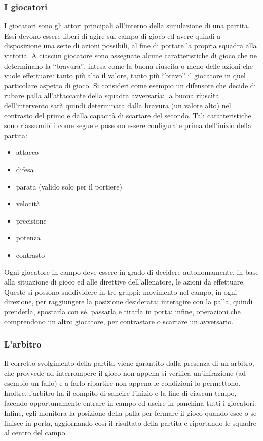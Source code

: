 \subsubsection{I giocatori}
\label{sec:analisi_giocatori}

I giocatori sono gli attori principali all'interno della simulazione di una partita. Essi devono essere liberi di agire sul campo di gioco ed avere quindi a disposizione una serie di azioni possibili, al fine di portare la propria squadra alla vittoria. A ciascun giocatore sono assegnate alcune caratteristiche di gioco che ne determinano la ``bravura'', intesa come la buona riuscita o meno delle azioni che vuole effettuare: tanto più alto il valore, tanto più ``bravo'' il giocatore in quel particolare aspetto di gioco. Si consideri come esempio un difensore che decide di rubare palla all'attaccante della squadra avversaria: la buona riuscita dell'intervento sarà quindi determinata dalla bravura (un valore alto) nel contrasto del primo e dalla capacità di scartare del secondo. Tali caratteristiche sono riassumibili come segue e possono essere configurate prima dell'inizio della partita:

\begin{itemize}
	\item attacco
	\item difesa
	\item parata (valido solo per il portiere)
	\item velocità
	\item precisione
	\item potenza
	\item contrasto
\end{itemize}

Ogni giocatore in campo deve essere in grado di decidere autonomamente, in base alla situazione di gioco ed alle direttive dell'allenatore, le azioni da effettuare. Queste  si possono suddividere in tre gruppi: movimento nel campo, in ogni direzione, per raggiungere la posizione desiderata; interagire con la palla, quindi prenderla, spostarla con sé, passarla e tirarla in porta; infine, operazioni che comprendono un altro giocatore, per contrastare o scartare un avversario.\\

\subsubsection{L'arbitro}
\label{sec:analisi_arbitro}

Il corretto svolgimento della partita viene garantito dalla presenza di un arbitro, che provvede ad interrompere il gioco non appena si verifica un'infrazione (ad esempio un fallo) e a farlo ripartire non appena le condizioni lo permettono. Inoltre, l'arbitro ha il compito di sancire l'inizio e la fine di ciascun tempo, facendo opportunamente entrare in campo ed uscire in panchina tutti i giocatori. Infine, egli monitora la posizione della palla per fermare il gioco quando esce o se finisce in porta, aggiornando così il risultato della partita e riportando le squadre al centro del campo.\\

